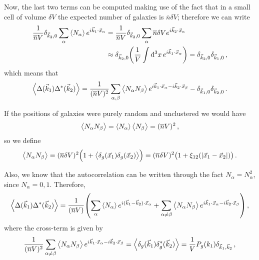 \documentclass[main.tex]{subfiles}
\begin{document}
Now, the last two terms can be computed making use of the fact that in a small cell of volume \(\delta V\) the expected number of galaxies is \(\overline{n} \delta V\); therefore we can write 
%
\begin{align}
\frac{1}{\overline{n} V} \delta_{\vec{k}_2, 0} \sum _{\alpha } \expval{N_\alpha } e^{i \vec{k}_1 \cdot \vec{x}_\alpha }
&= \frac{1}{\overline{n} V} \delta_{\vec{k}_2, 0} \sum _{\alpha } \overline{n} \delta V e^{i \vec{k}_2 \cdot \vec{x}_\alpha }  \\
&\approx \delta_{\vec{k}_2, 0} \qty( \frac{1}{V} \int \dd[3]{x} e^{i \vec{k}_1 \cdot \vec{x}_\alpha }) = \delta_{\vec{k}_2, 0} \delta_{\vec{k}_1, 0} 
\,,
\end{align}
%
which means that 
%
\begin{align}
\expval{ \Delta (\vec{k}_1) \Delta^{*} (\vec{k}_2)} = \frac{1}{(\overline{n} V)^2} \sum _{\alpha , \beta } \expval{N_\alpha N_\beta } e^{i \vec{k}_1 \cdot \vec{x}_\alpha - i \vec{k}_2 \cdot \vec{x}_\beta } - \delta_{\vec{k}_1, 0} \delta_{\vec{k}_2, 0}
\,.
\end{align}

If the positions of galaxies were purely random and unclustered we would have 
%
\begin{align}
\expval{N_\alpha N_\beta } = \expval{N_\alpha } \expval{N_\beta } =(\overline{n}V)^2
\,,
\end{align}
%
so we define 
%
\begin{align}
\expval{N_\alpha N_\beta } = (\overline{n} \delta V)^2 \qty(1 + \expval{ \delta _g (\vec{x}_1) \delta _g (\vec{x}_2)} )
= (\overline{n} \delta V)^2 \qty(1 + \xi _{12} (\abs{\vec{x}_1 - \vec{x}_2}))
\,.
\end{align}

Also, we know that the autocorrelation can be written through the fact \(N_\alpha = N_\alpha^2\), since \(N_\alpha = 0, 1\). 
Therefore, 
%
\begin{align}
\expval{ \Delta(\vec{k}_1 ) \Delta^{*} (\vec{k}_2)} = \frac{1}{(\overline{n} V)} \qty(\sum _{\alpha } \expval{N_\alpha } e^{i (\vec{k}_1 - \vec{k}_2) \cdot \vec{x}_\alpha } + \sum _{\alpha \neq \beta } \expval{N_\alpha N_\beta } e^{i \vec{k}_1 \cdot \vec{x}_\alpha - i \vec{k}_2 \cdot \vec{x}_\beta })
\,,
\end{align}
%
where the cross-term is given by 
%
\begin{align}
\frac{1}{(\overline{n} V)^2} 
\sum _{\alpha \neq \beta } \expval{N_\alpha N_\beta } e^{i \vec{k}_1 \cdot \vec{x}_\alpha - i \vec{k}_2 \cdot \vec{x}_\beta }
= \expval{ \delta _g (\vec{k}_1) \delta _g^{*} (\vec{k}_2)} = \frac{1}{V } P_g(k_1) \delta_{\vec{k}_1, \vec{k}_2}
\,,
\end{align}
\end{document}
